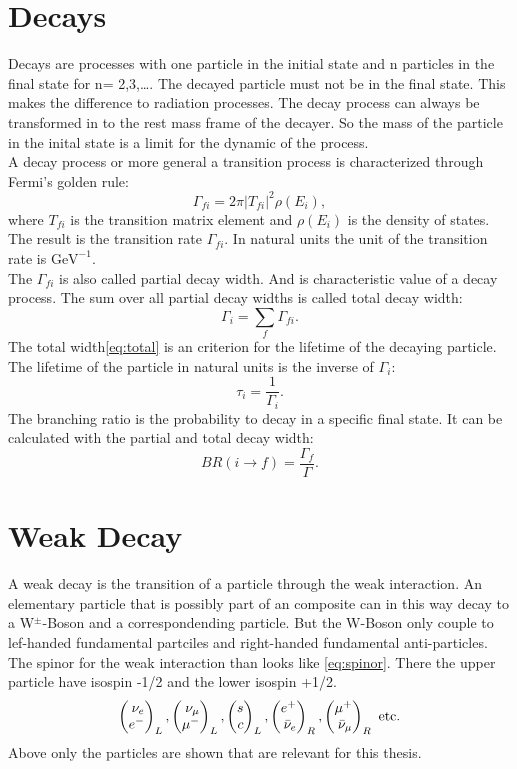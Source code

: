 \section{Decays}
Decays are processes with one particle in the initial state and n particles 
in the final state for n= 2,3,{\ldots}. The decayed particle must not be in the final 
state. This makes the difference to radiation processes. The decay process can 
always be transformed in to the rest mass frame of the decayer. So the mass 
of the particle in the inital state is a limit for the dynamic of the process.\\
A decay process or more general a transition process is characterized through 
Fermi's golden rule:
\begin{equation}
  \Gamma_{fi} = 2 \pi |T_{fi}|^2 \rho\left(E_i\right), \label{eq:fermi}
\end{equation}
where \(T_{fi}\) is the transition matrix element and 
\(\rho\left(E_i\right)\) is the density of states. The result is the transition 
rate \(\Gamma_{fi}\). In natural units the unit of the transition rate is \(\text{GeV}^{-1}\).\\
The \(\Gamma_{fi}\) is also called partial decay width. And is characteristic value 
of a decay process. The sum over all partial decay widths is called 
total decay width:
\begin{equation}
  \Gamma_i = \sum_f \Gamma_{fi}. \label{eq:total}
\end{equation}
The total width{\eqref{eq:total}} is an criterion for the lifetime of the 
decaying particle. The lifetime  of the particle in natural units is the 
inverse of \(\Gamma_i\):
\begin{equation}
  \tau_i = \frac{1}{\Gamma_i}. \label{eq:lifetime}
\end{equation}
The branching ratio is the probability to decay in a specific final 
state. It can be calculated with the partial and total decay width:
\begin{equation}
  BR( i \rightarrow f) = \frac{\Gamma_f}{\Gamma}. \label{eq:br}
\end{equation}

\section{Weak Decay}
A weak decay is the transition of a particle through the weak interaction. An 
elementary particle that is possibly part of an composite can in this 
way decay to a W\(^\pm\)-Boson and a correspondending particle. But the W-Boson only 
couple to lef-handed fundamental partciles and right-handed fundamental 
anti-particles. The spinor for the weak interaction than looks like 
{\eqref{eq:spinor}}. There the upper particle have isospin -1/2 and the lower isospin 
+1/2.
\begin{equation}
  \Spvek{\nu_e; e^-}_L,\Spvek{\nu_\mu; \mu^-}_L, \Spvek{s; c}_L, \Spvek{e^+; \bar{\nu}_e}_R, 
  \Spvek{\mu^+; \bar{\nu}_\mu}_R \text{ etc.} \label{eq:spinor}
\end{equation}
Above only the particles are shown that are relevant for this 
thesis.

